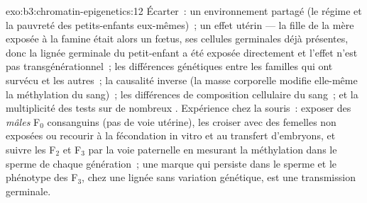 \begin{solution}{exo:b3:chromatin-epigenetics:12}
Écarter~: un environnement partagé (le régime et la pauvreté des
petits-enfants eux-mêmes)~; un effet utérin --- la fille de la mère
exposée à la famine était alors un fœtus, ses cellules germinales déjà
présentes, donc la lignée germinale du petit-enfant a été exposée
directement et l'effet n'est pas transgénérationnel~; les différences
génétiques entre les familles qui ont survécu et les autres~; la
causalité inverse (la masse corporelle modifie elle-même la méthylation
du sang)~; les différences de composition cellulaire du sang~; et la
multiplicité des tests sur de nombreux . Expérience chez la souris~:
exposer des \emph{mâles} F$_0$ consanguins (pas de voie utérine), les
croiser avec des femelles non exposées ou recourir à la fécondation in
vitro et au transfert d'embryons, et suivre les F$_2$ et F$_3$ par la
voie paternelle en mesurant la méthylation dans le sperme de chaque
génération~; une marque qui persiste dans le sperme et le phénotype des
F$_3$, chez une lignée sans variation génétique, est une transmission
germinale.
\end{solution}

